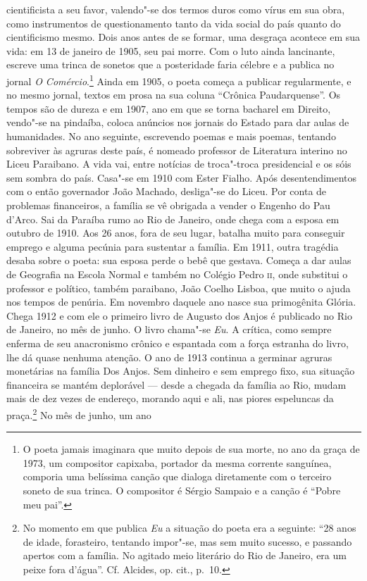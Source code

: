 cientificista a seu favor, valendo"-se dos termos duros como vírus em
sua obra, como instrumentos de questionamento tanto da vida social do
país quanto do cientificismo mesmo. Dois anos antes de se formar, uma
desgraça acontece em sua vida: em 13 de janeiro de 1905, seu pai 
morre. Com o luto ainda lancinante, escreve uma trinca de
sonetos que a posteridade faria célebre e a publica no jornal \textit{O
Comércio}.\footnote{O poeta jamais imaginara que muito depois de sua morte, no
ano da graça de 1973, um compositor capixaba, portador da mesma
corrente sanguínea, comporia uma belíssima canção que dialoga
diretamente com o terceiro soneto de sua trinca. O compositor é Sérgio
Sampaio e a canção é “Pobre meu pai”.} Ainda em 1905, o poeta começa a
publicar regularmente, e no mesmo jornal, textos em prosa na sua coluna
“Crônica Paudarquense”. Os tempos são de dureza e em 1907, ano em que
se torna bacharel em Direito, vendo"-se na pindaíba, coloca anúncios nos
jornais do Estado para dar aulas de humanidades. No ano seguinte,
escrevendo poemas e mais poemas, tentando sobreviver às agruras deste
país, é nomeado professor de Literatura interino no Liceu Paraibano. A
vida vai, entre notícias de troca"-troca presidencial e os sóis sem
sombra do país. Casa"-se em 1910 com Ester Fialho. Após desentendimentos
com o então governador João Machado, desliga"-se do Liceu. Por conta de
problemas financeiros, a família se vê obrigada a vender o Engenho do
Pau d’Arco. Sai da Paraíba rumo ao Rio de Janeiro, onde chega com a
esposa em outubro de 1910. Aos 26 anos, fora de seu lugar, batalha
muito para conseguir emprego e alguma pecúnia para sustentar a família.
Em 1911, outra tragédia desaba sobre o poeta: sua esposa
perde o bebê que gestava. Começa a dar aulas de Geografia na Escola Normal e também
no Colégio Pedro \textsc{ii}, onde substitui o professor e político, também
paraibano, João Coelho Lisboa, que muito o ajuda nos tempos de penúria.
Em novembro daquele ano nasce sua primogênita Glória. Chega 1912 e com
ele o primeiro livro de Augusto dos Anjos é publicado no Rio de
Janeiro, no mês de junho. O livro chama"-se \textit{Eu}. A crítica, como
sempre enferma de seu anacronismo crônico e espantada com a força
estranha do livro, lhe dá quase nenhuma atenção. O ano de 1913 continua
a germinar agruras monetárias na família Dos Anjos. Sem dinheiro e sem
emprego fixo, sua situação financeira se mantém deplorável --- desde a
chegada da família ao Rio, mudam mais de dez vezes de endereço, morando
aqui e ali, nas piores espeluncas da praça.\footnote{ No momento em que
publica \textit{Eu} a situação do poeta era a seguinte: “28 anos de
idade, forasteiro, tentando impor"-se, mas sem muito sucesso, e passando
apertos com a família. No agitado meio literário do Rio de Janeiro, era
um peixe fora d’água”. Cf. Alcides, op. cit., p.~10.} No mês de junho, um ano
